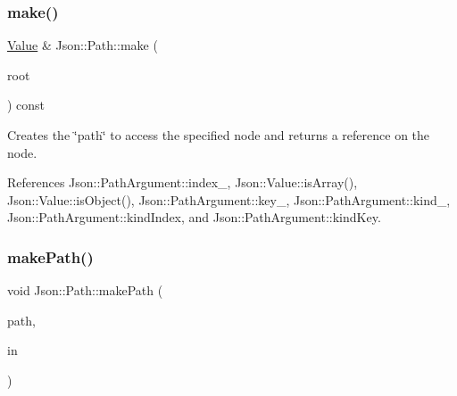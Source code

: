 \mbox{\label{classJson_1_1Path_a858f9426f0f7bbe0450644d72b44e26b_a858f9426f0f7bbe0450644d72b44e26b}} 
\subsubsection{\texorpdfstring{make()}{make()}}
{\footnotesize\ttfamily \hyperlink{classJson_1_1Value}{Value} \& Json\+::\+Path\+::make (\begin{DoxyParamCaption}\item[{\hyperlink{classJson_1_1Value}{Value} \&}]{root }\end{DoxyParamCaption}) const}

Creates the \char`\"{}path\char`\"{} to access the specified node and returns a reference on the node. 

References Json\+::\+Path\+Argument\+::index\+\_\+, Json\+::\+Value\+::is\+Array(), Json\+::\+Value\+::is\+Object(), Json\+::\+Path\+Argument\+::key\+\_\+, Json\+::\+Path\+Argument\+::kind\+\_\+, Json\+::\+Path\+Argument\+::kind\+Index, and Json\+::\+Path\+Argument\+::kind\+Key.

\mbox{\label{classJson_1_1Path_a362a420a47acb1a1f9c79173cbfef94d_a362a420a47acb1a1f9c79173cbfef94d}} 
\subsubsection{\texorpdfstring{make\+Path()}{makePath()}}
{\footnotesize\ttfamily void Json\+::\+Path\+::make\+Path (\begin{DoxyParamCaption}\item[{const \hyperlink{json_8h_a1e723f95759de062585bc4a8fd3fa4be_a1e723f95759de062585bc4a8fd3fa4be}{J\+S\+O\+N\+C\+P\+P\+\_\+\+S\+T\+R\+I\+NG} \&}]{path,  }\item[{const \hyperlink{classJson_1_1Path_ab29d7b2fc896c7d3c5ed4609af3a3f23_ab29d7b2fc896c7d3c5ed4609af3a3f23}{In\+Args} \&}]{in }\end{DoxyParamCaption})\hspace{0.3cm}{\ttfamily [private]}}



